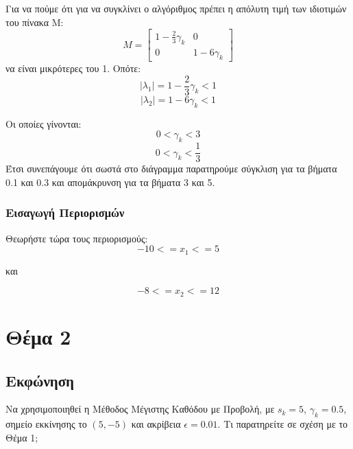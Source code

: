 \documentclass{report}
\begin{document}
Για να πούμε ότι για να συγκλίνει ο αλγόριθμος πρέπει η απόλυτη τιμή των ιδιοτιμών του πίνακα M: 
$$M = \begin{bmatrix} 1 - \frac{2}{3}\gamma_k & 0 \\ 0 & 1 - 6\gamma_k \end{bmatrix}$$
να είναι μικρότερες του 1. Οπότε:
$$|\lambda_1|= 1 - \frac{2}{3}\gamma_k < 1$$
$$|\lambda_2| = 1 - 6\gamma_k < 1$$

Οι οποίες γίνονται:
$$0 < \gamma_k < 3$$
$$0 < \gamma_k < \frac{1}{3}$$
Έτσι συνεπάγουμε ότι σωστά στο διάγραμμα παρατηρούμε σύγκλιση για τα βήματα 0.1 και 0.3 και 
απομάκρυνση για τα βήματα 3 και 5.


\subsection{Εισαγωγή Περιορισμών}
Θεωρήστε τώρα τους περιορισμούς:
$$-10 <= x_1 <= 5$$  
\begin{center}
    και
\end{center}
$$-8 <= x_2 <= 12$$


\chapter{Θέμα 2}
\section{Εκφώνηση}
Να χρησιμοποιηθεί η Μέθοδος Μέγιστης Καθόδου με Προβολή, με $s_k = 5$, $\gamma_k = 0.5$,
σημείο εκκίνησης το $(5, -5)$ και ακρίβεια $\epsilon = 0.01$. Τι παρατηρείτε σε σχέση με το 
Θέμα 1;
\end{document}
